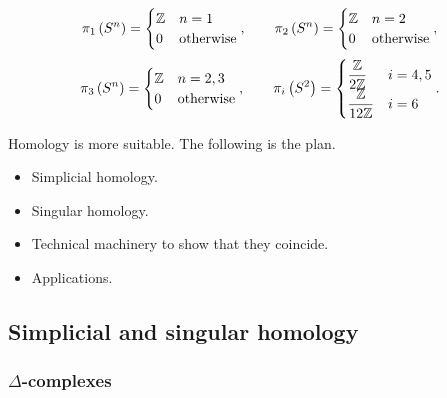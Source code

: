 \begin{example*}
$$ \pi_1\left( S^n \right) =
\begin{cases}
\mathbb{Z} & n = 1 \\
0 & \text{otherwise}
\end{cases},
\qquad \pi_2\left( S^n \right) =
\begin{cases}
\mathbb{Z} & n = 2 \\
0 & \text{otherwise}
\end{cases},
$$
$$ \pi_3\left( S^n \right) =
\begin{cases}
\mathbb{Z} & n = 2, 3 \\
0 & \text{otherwise}
\end{cases},
\qquad \pi_i\left( S^2 \right) =
\begin{cases}
\dfrac{\mathbb{Z}}{2\mathbb{Z}} & i = 4, 5 \\
\dfrac{\mathbb{Z}}{12\mathbb{Z}} & i = 6
\end{cases}.
$$
\end{example*}

Homology is more suitable. The following is the plan.
\begin{itemize}
\item Simplicial homology.
\item Singular homology.
\item Technical machinery to show that they coincide.
\item Applications.
\end{itemize}

\subsection{Simplicial and singular homology}

\subsubsection{$ \Delta $-complexes}

